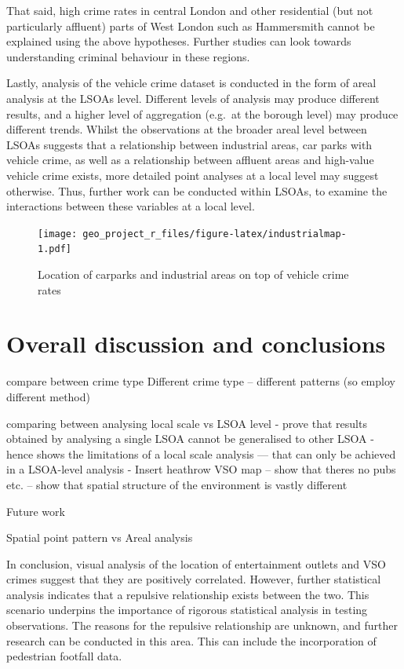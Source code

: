 \documentclass[]{article}
\theoremstyle{definition}
\theoremstyle{definition}
\theoremstyle{definition}
\theoremstyle{remark}
\begin{document}
That said, high crime rates in central London and other residential (but
not particularly affluent) parts of West London such as Hammersmith
cannot be explained using the above hypotheses. Further studies can look
towards understanding criminal behaviour in these regions.

Lastly, analysis of the vehicle crime dataset is conducted in the form
of areal analysis at the LSOAs level. Different levels of analysis may
produce different results, and a higher level of aggregation (e.g.~at
the borough level) may produce different trends. Whilst the observations
at the broader areal level between LSOAs suggests that a relationship
between industrial areas, car parks with vehicle crime, as well as a
relationship between affluent areas and high-value vehicle crime exists,
more detailed point analyses at a local level may suggest otherwise.
Thus, further work can be conducted within LSOAs, to examine the
interactions between these variables at a local level.

\begin{figure}
\centering
\texttt{[image: geo\_project\_r\_files/figure-latex/industrialmap-1.pdf]}
\caption{\label{fig:industrialmap}Location of carparks and industrial areas
on top of vehicle crime rates}
\end{figure}

\pagebreak

\section{Overall discussion and
conclusions}\label{overall-discussion-and-conclusions}

compare between crime type Different crime type -- different patterns
(so employ different method)

comparing between analysing local scale vs LSOA level - prove that
results obtained by analysing a single LSOA cannot be generalised to
other LSOA - hence shows the limitations of a local scale analysis ---
that can only be achieved in a LSOA-level analysis - Insert heathrow VSO
map -- show that theres no pubs etc. -- show that spatial structure of
the environment is vastly different

Future work

Spatial point pattern vs Areal analysis

In conclusion, visual analysis of the location of entertainment outlets
and VSO crimes suggest that they are positively correlated. However,
further statistical analysis indicates that a repulsive relationship
exists between the two. This scenario underpins the importance of
rigorous statistical analysis in testing observations. The reasons for
the repulsive relationship are unknown, and further research can be
conducted in this area. This can include the incorporation of pedestrian
footfall data.
\end{document}
